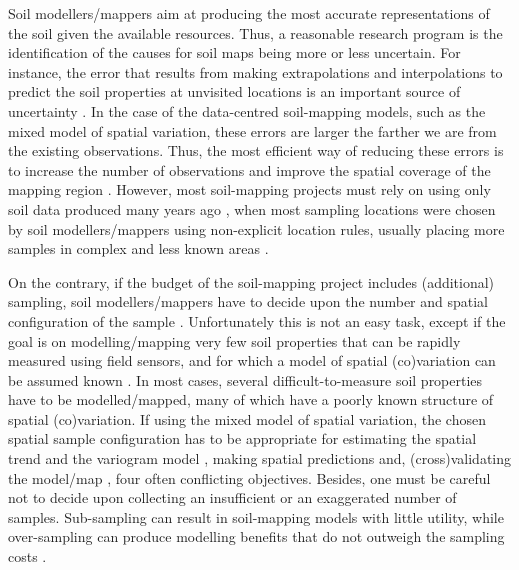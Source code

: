 Soil modellers/mappers aim at producing the most accurate representations of the soil given the 
available resources. Thus, a reasonable research program is the identification of the causes for 
soil maps being more or less uncertain. For instance, the error that results from making 
extrapolations and interpolations to predict the soil properties at unvisited locations is an 
important source of uncertainty \cite{HeuvelinkEtAl1999,RefsgaardEtAl2006}. In the case of the 
data-centred soil-mapping models, such as the mixed model of spatial variation, these errors are 
larger the farther we are from the existing observations. Thus, the most efficient way of reducing 
these errors is to increase the number of observations and improve the spatial coverage of the mapping
region \cite{BrusEtAl2007a}. However, most soil-mapping projects must rely on using only soil 
data produced many years ago 
\cite{KempenEtAl2009,HenglEtAl2014,PoggioEtAl2014,NussbaumEtAl2014,MulderEtAl2016}, when most sampling
locations were chosen by soil modellers/mappers using non-explicit
location rules, usually placing more samples in complex and less known areas \cite{Rossiter2000}.

On the contrary, if the budget of the soil-mapping project includes (additional) sampling, soil 
modellers/mappers have to decide upon the number and spatial configuration of the sample 
\cite{deGruijterEtAl2006,WebsterEtAl2013}. Unfortunately this is not an easy task, except if the 
goal is on modelling/mapping very few soil properties that can be rapidly measured using field 
sensors, and for which a model of spatial (co)variation can be assumed known \cite{MarchantEtAl2006}.
In most cases, several difficult-to-measure soil properties have to be modelled/mapped, many of 
which have a poorly known structure of spatial (co)variation. If using the mixed model of spatial 
variation, the chosen spatial sample configuration has to be appropriate for estimating the spatial 
trend \cite{HenglEtAl2003a,MinasnyEtAl2006b} and the variogram model 
\cite{WarrickEtAl1987,WebsterEtAl1992,Lark2002}, making spatial predictions
\cite{YfantisEtAl1987,WalvoortEtAl2010} and, (cross)validating the model/map \cite{BrusEtAl2011}, four 
often conflicting objectives. Besides, one
must be careful not to decide upon collecting an insufficient or an exaggerated number of samples. 
Sub-sampling can result in soil-mapping models with little utility, while over-sampling can produce
modelling benefits that do not outweigh the sampling costs \cite{vanGroenigenEtAl1999}.

